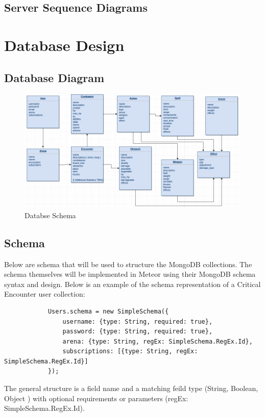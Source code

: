 \documentclass[12pt,a4paper]{report}
\begin{document}
	\subsection{Server Sequence Diagrams}

\newpage
\section{Database Design}
	\subsection {Database Diagram}
		\begin{figure}[h]
			\centering
			\includegraphics[scale=.4]{database_schema}
			\caption{Databse Schema}
			\label{fig: Databse Schema }
		\end{figure}
	\subsection{Schema}
		Below are schema that will be used to structure the MongoDB collections. The schema themselves will be implemented in Meteor using their MongoDB schema syntax and design. Below is an example of the schema representation of a Critical Encounter user collection:
		
		\begin{lstlisting}
			Users.schema = new SimpleSchema({
				username: {type: String, required: true},
				password: {type: String, required: true},
				arena: {type: String, regEx: SimpleSchema.RegEx.Id},
				subscriptions: [{type: String, regEx: SimpleSchema.RegEx.Id}]
			});
		\end{lstlisting}
		
		The general structure is a field name and a matching feild type (String, Boolean, Object ) with optional requirements or parameters (regEx: SimpleSchema.RegEx.Id).
		
\end{document}
